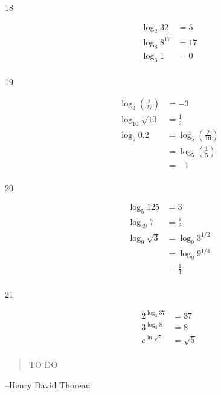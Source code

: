 \documentclass{exam}
\begin{document}
\begin{description}
    \item[18]
      \begin{align*}
        \log_2 32     &= 5 \\
        \log_8 8^{17} &= 17 \\
        \log_6 1      &= 0 \\
      \end{align*}

    \item[19]
      \begin{align*}
        \log_3 \left( \frac{1}{27} \right) &= -3 \\
        \log_{10} \sqrt{10}                &= \frac{1}{2} \\
        \log_5 0.2                         &= \log_5 \left( \frac{2}{10} \right) \\
                                           &= \log_5 \left( \frac{1}{5} \right) \\
                                           &= -1 \\
      \end{align*}

    \item[20]
      \begin{align*}
        \log_5 125      &= 3 \\
        \log_{49} 7     &= \frac{1}{2} \\
        \log_9 \sqrt{3} &= \log_9 3^{1/2} \\
                        &= \log_9 9^{1/4} \\
                        &= \frac{1}{4} \\
      \end{align*}

    \item[21]
      \begin{align*}
        2^{\log_2 37}    &= 37 \\
        3^{\log_3 8}     &= 8 \\
        e^{\ln \sqrt{5}} &= \sqrt{5} \\
      \end{align*}

    \end{description}


  \else
    \vspace{6 cm}
    \begin{quote}
      \begin{em}
        TO DO
      \end{em}
    \end{quote}

    \hspace{1 cm} --Henry David Thoreau
  \fi
\end{document}
